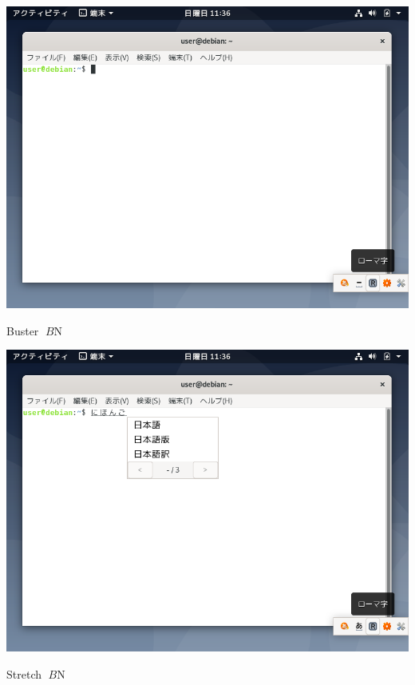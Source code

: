 \documentclass[mingoth,a4paper]{jsarticle}
\begin{document}
{{{{{{{{{{{{{{{{\begin{center}
\includegraphics[keepaspectratio,width=1\hsize]{image201907/buster_gnome_2.png}
\end{center}



Buster $B$N%

\begin{center}
\includegraphics[keepaspectratio,width=1\hsize]{image201907/buster_gnome_3.png}
\end{center}



Stretch $B$N%

}}}}}}}}}}}}}}}}
\end{document}
